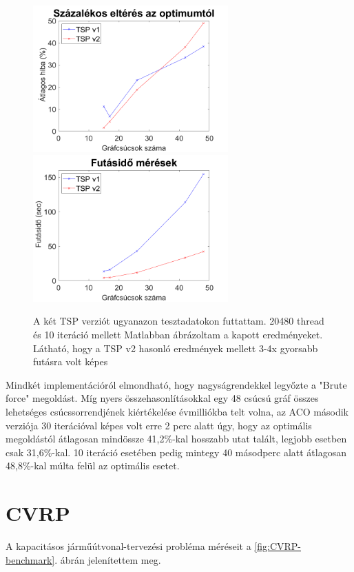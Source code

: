 \begin{figure}[ht!]
	\includegraphics[width=75mm, keepaspectratio]{figures/TSP-benchmark-error.png}
	\includegraphics[width=75mm, keepaspectratio]{figures/TSP-benchmark-time.png}
	\caption{A két TSP verziót ugyanazon tesztadatokon futtattam. 20480 thread és 10 iteráció mellett Matlabban ábrázoltam a kapott eredményeket. Látható, hogy a TSP v2 hasonló eredmények mellett 3-4x gyorsabb futásra volt képes}
	\label{fig:TSP-benchmark}
\end{figure}

Mindkét implementációról elmondható, hogy nagyságrendekkel legyőzte a "Brute force" megoldást. Míg nyers összehasonlításokkal egy 48 csúcsú gráf összes lehetséges csúcssorrendjének kiértékelése évmilliókba telt volna, az ACO második verziója 30 iterációval képes volt erre 2 perc alatt úgy, hogy az optimális megoldástól átlagosan mindössze 41,2\%-kal hosszabb utat talált, legjobb esetben csak 31,6\%-kal. 10 iteráció esetében pedig mintegy 40 másodperc alatt átlagosan 48,8\%-kal múlta felül az optimális esetet.
  

\section{CVRP}
A kapacitásos járműútvonal-tervezési probléma méréseit a \ref{fig:CVRP-benchmark}. ábrán jelenítettem meg.

